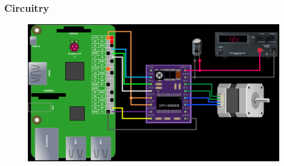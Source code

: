 \documentclass{beamer}
\begin{document}
\begin{frame}

    \frametitle{Circuitry}

        \begin{figure}
            \centering
            \includegraphics[width=\textwidth]{connections.png}
        \end{figure}

\end{frame}
\end{document}
